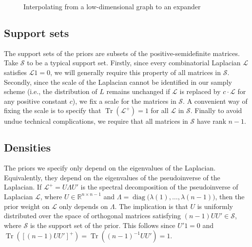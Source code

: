 \documentclass[12pt]{article}
\newcommand{\reals}{\mathbb{R}}
\DeclareMathOperator*{\Tr}{Tr}
\DeclareMathOperator*{\diag}{diag}
\theoremstyle{plain}
\begin{document}
\begin{figure}
    \centering
    \caption{Interpolating from a low-dimensional graph to an expander}
\end{figure}



\subsection{Support sets}

The support sets of the priors are subsets of the
positive-semidefinite matrices.  Take $\mathcal{S}$ to be a typical
support set.  Firstly, since every combinatorial Laplacian
$\mathcal{L}$ satisfies $\mathcal{L} 1 = 0$, we will generally require
this property of all matrices in $\mathcal{S}$.  Secondly, since the
scale of the Laplacian cannot be identified in our samply scheme
(i.e., the distribution of $L$ remains unchanged if $\mathcal{L}$ is
replaced by $c \cdot \mathcal{L}$ for any positive constant $c$), we
fix a scale for the matrices in $\mathcal{S}$.  A convenient way of
fixing the scale is to specify that $\Tr(\mathcal{L}^+) = 1$ for
all $\mathcal{L}$ in $\mathcal{S}$.  Finally to avoid undue technical
complications, we require that all matrices in $\mathcal{S}$ have rank
$n-1$.



\subsection{Densities}

The priors we specify only depend on the eigenvalues of the Laplacian.
Equivalently, they depend on the eigenvalues of the pseudoinverse of
the Laplacian.  If $\mathcal{L}^+ = U \Lambda U'$ is the spectral
decomposition of the pseudoinverse of Laplacian $\mathcal{L}$, where
$U \in \reals^{n \times n -1}$ and
$\Lambda = \diag\big(\lambda(1), \dotsc, \lambda({n-1})\big)$, then the prior
weight on $\mathcal{L}$ only depends on $\Lambda$.  The implication is
that $U$ is uniformly distributed over the space of orthogonal
matrices satisfying $(n-1) U U' \in \mathcal{S}$, where $\mathcal{S}$ is the
support set of the prior.  This follows since $U'1 = 0$ and $\Tr([(n-1) U U']^+) =
\Tr((n-1)^{-1} U U') = 1$.
\end{document}
